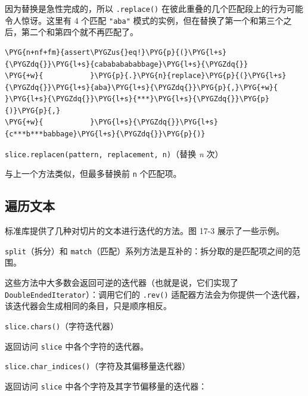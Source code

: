 因为替换是急性完成的，所以 \texttt{.replace()} 在彼此重叠的几个匹配段上的行为可能令人惊讶。这里有 4 个匹配 \texttt{"aba"} 模式的实例，但在替换了第一个和第三个之后，第二个和第四个就不再匹配了。

\begin{Verbatim}[commandchars=\\\{\},breaklines=true,breakanywhere=true,fontsize=\codefont,xleftmargin=17bp]
\PYG{n+nf+fm}{assert\PYGZus{}eq!}\PYG{p}{(}\PYG{l+s}{\PYGZdq{}}\PYG{l+s}{cabababababbage}\PYG{l+s}{\PYGZdq{}}
\PYG{+w}{           }\PYG{p}{.}\PYG{n}{replace}\PYG{p}{(}\PYG{l+s}{\PYGZdq{}}\PYG{l+s}{aba}\PYG{l+s}{\PYGZdq{}}\PYG{p}{,}\PYG{+w}{ }\PYG{l+s}{\PYGZdq{}}\PYG{l+s}{***}\PYG{l+s}{\PYGZdq{}}\PYG{p}{)}\PYG{p}{,}
\PYG{+w}{           }\PYG{l+s}{\PYGZdq{}}\PYG{l+s}{c***b***babbage}\PYG{l+s}{\PYGZdq{}}\PYG{p}{)}
\end{Verbatim}

\begin{myNote}
\texttt{slice.replacen(pattern, replacement, n)}（替换 \emph{n} 次）
\end{myNote}

与上一个方法类似，但最多替换前 \texttt{n} 个匹配项。

\subsection{遍历文本}

标准库提供了几种对切片的文本进行迭代的方法。图 17-3 展示了一些示例。


\texttt{split}（拆分）和 \texttt{match}（匹配）系列方法是互补的：拆分取的是匹配项之间的范围。

这些方法中大多数会返回可逆的迭代器（也就是说，它们实现了 \texttt{DoubleEndedIterator}）：调用它们的 \texttt{.rev()} 适配器方法会为你提供一个迭代器，该迭代器会生成相同的条目，只是顺序相反。

\begin{mySidenote}
\texttt{slice.chars()}（字符迭代器）
\end{mySidenote}

返回访问 \texttt{slice} 中各个字符的迭代器。

\begin{myNote}
\texttt{slice.char\_indices()}（字符及其偏移量迭代器）
\end{myNote}

返回访问 \texttt{slice} 中各个字符及其字节偏移量的迭代器：

